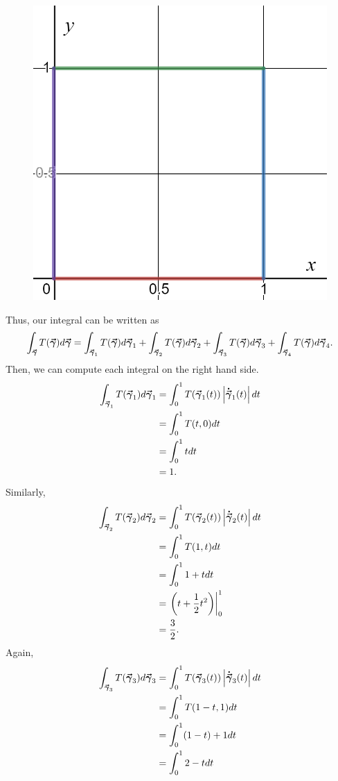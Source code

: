 \documentclass[12pt]{article} %
\begin{document}
\begin{solution}
\begin{enumerate}[(a)]
\begin{figure}[H]
			\centering
			\includegraphics[width=.6\textwidth]{Images/plate_boundary.png}
		\end{figure}
		Thus, our integral can be written as
		\[
		\int_{\boldsymbol{\vec{\gamma}}} T(\boldsymbol{\vec{\gamma}}) d\boldsymbol{\vec{\gamma}} = \int_{\boldsymbol{\vec{\gamma}}_1} T(\boldsymbol{\vec{\gamma}}) d\boldsymbol{\vec{\gamma}}_1 + \int_{\boldsymbol{\vec{\gamma}}_2} T(\boldsymbol{\vec{\gamma}}) d\boldsymbol{\vec{\gamma}}_2 + \int_{\boldsymbol{\vec{\gamma}}_3} T(\boldsymbol{\vec{\gamma}}) d\boldsymbol{\vec{\gamma}}_3 + \int_{\boldsymbol{\vec{\gamma}}_4} T(\boldsymbol{\vec{\gamma}}) d\boldsymbol{\vec{\gamma}}_4.
		\]
		Then, we can compute each integral on the right hand side.
		\begin{align*}
			\int_{\boldsymbol{\vec{\gamma}}_1} T(\boldsymbol{\vec{\gamma}}_1) d\boldsymbol{\vec{\gamma}}_1 &= \int_0^1 T(\boldsymbol{\vec{\gamma}}_1(t))\left|\boldsymbol{\dot{\vec{\gamma}}}_1(t)\right|dt\\
			&= \int_0^1 T(t,0) dt\\
			&= \int_0^1 t dt\\
			&= 1.
		\end{align*}
		Similarly, 
		\begin{align*}
				\int_{\boldsymbol{\vec{\gamma}}_2} T(\boldsymbol{\vec{\gamma}}_2) d\boldsymbol{\vec{\gamma}}_2 &= \int_0^1 T(\boldsymbol{\vec{\gamma}}_2(t))\left|\boldsymbol{\dot{\vec{\gamma}}}_2(t)\right|dt\\
				&= \int_0^1 T(1,t) dt\\
				&= \int_0^1 1+t dt\\
				&= \left.\left(t+\frac{1}{2}t^2\right)\right\vert_0^1\\
				&= \frac{3}{2}.
		\end{align*}	
		Again,
		\begin{align*}
				\int_{\curvegamma_3} T(\curvegamma_3) d\curvegamma_3 &= \int_0^1 T(\curvegamma_3(t))\left|\tangentgamma_3(t)\right|dt\\
				&= \int_0^1 T(1-t,1) dt\\
				&= \int_0^1 (1-t)+1 dt\\
				&= \int_0^1 2-tdt\\

\end{align*}
\end{enumerate}
\end{solution}
\end{document}
